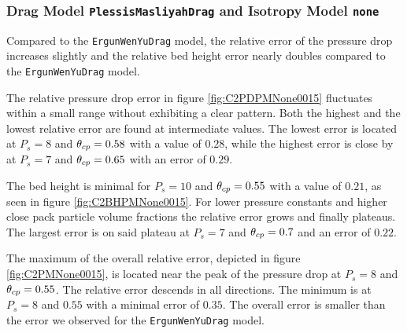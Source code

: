 

\subsubsection{Drag Model \lstinline|PlessisMasliyahDrag| and Isotropy Model \lstinline|none|}
Compared to the \lstinline|ErgunWenYuDrag| model, the relative error of the pressure drop increases slightly and the relative bed height error nearly doubles compared to the \lstinline|ErgunWenYuDrag| model.

The relative pressure drop error in figure \ref{fig:C2PDPMNone0015} fluctuates within a small range without exhibiting a clear pattern.
Both the highest and the lowest relative error are found at intermediate values.
The lowest error is located at $P_s = 8$ and $\theta_{cp} = 0.58$ with a value of $0.28$, while the highest error is close by at $P_s = 7$ and $\theta_{cp} = 0.65$ with an error of $0.29$.

The bed height is minimal for $P_s = 10$ and $\theta_{cp} = 0.55$ with a value of $0.21$, as seen in figure \ref{fig:C2BHPMNone0015}. For lower pressure constants and higher close pack particle volume fractions the relative error grows and finally plateaus. 
The largest error is on said plateau at $P_s = 7$ and $\theta_{cp} = 0.7$ and an error of $0.22$.

The maximum of the overall relative error, depicted in figure \ref{fig:C2PMNone0015}, is located near the peak of the pressure drop at $P_s =8$ and $\theta_{cp} = 0.55$. The relative error descends in all directions.
The minimum is at $P_s = 8$ and $0.55$ with a minimal error of $0.35$.
The overall error is smaller than the error we observed for the \lstinline|ErgunWenYuDrag| model.

